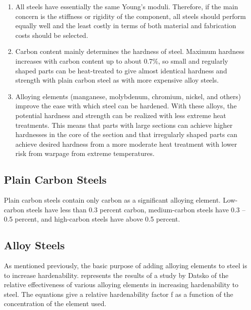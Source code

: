 \documentclass[a4paper,openany,12pt]{book}
\begin{document}
\begin{enumerate}
\item All steels have essentially the same Young's moduli. Therefore, if
the main concern is the stiffness or rigidity of the component, all
steels should perform equally well and the least costly in terms of
both material and fabrication costs should be selected.

\item Carbon content mainly determines the hardness of steel. Maximum
hardness increases with carbon content up to about 0.7\%, so small and
regularly shaped parts can be heat-treated to give almost identical
hardness and strength with plain carbon steel as with more expensive
alloy steels.

\item Alloying elements (manganese, molybdenum, chromium, nickel, and
others) improve the ease with which steel can be hardened. With these
alloys, the potential hardness and strength can be realized with less
extreme heat treatments. This means that parts with large sections
can achieve higher hardnesses in the core of the section and that
irregularly shaped parts can achieve desired hardness from a more
moderate heat treatment with lower risk from warpage from extreme
temperatures.
\end{enumerate}

\subsection{Plain Carbon Steels}
\label{plain-carbon-steels}
Plain carbon steels contain only carbon as a significant alloying
element. Low-carbon steels have less than 0.3 percent carbon,
medium-carbon steels have 0.3 -- 0.5 percent, and high-carbon steels
have above 0.5 percent.

\subsection{Alloy Steels}
\label{alloy-steels}
As mentioned previously, the basic purpose of adding alloying elements
to steel is to increase hardenability. represents the results of a study
by Datsko \cite{datsko1977materials} of the relative effectiveness of
various alloying elements in increasing hardenability to steel. The
equations give a relative hardenability factor f as a function of the
concentration of the element used.
\end{document}
